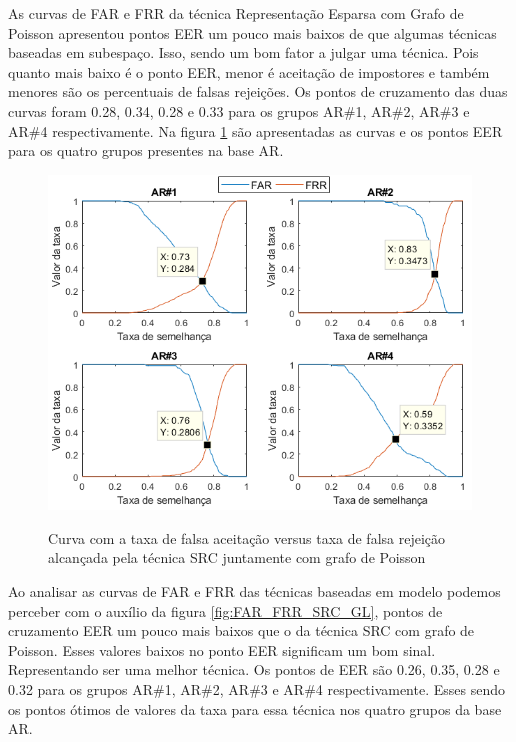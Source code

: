 As curvas de FAR e FRR da técnica Representação Esparsa com Grafo de Poisson apresentou pontos EER um pouco mais baixos de que algumas técnicas baseadas em subespaço. Isso, sendo um bom fator a julgar uma técnica. Pois quanto mais baixo é o ponto EER, menor é aceitação de impostores e também menores são os percentuais de falsas rejeições. Os pontos de cruzamento das duas curvas foram 0.28, 0.34, 0.28 e 0.33 para os grupos AR\#1, AR\#2, AR\#3 e AR\#4 respectivamente. Na figura \ref{fig:FAR_FRR_SRC_GP} são apresentadas as curvas e os pontos EER para os quatro grupos presentes na base AR.

\begin{figure}[H]
\centering
\caption{Curva com a taxa de falsa aceitação versus taxa de falsa rejeição alcançada pela técnica SRC juntamente com grafo de Poisson}
\includegraphics[scale=0.60]{imgs4/graficos_FAR_FRR/SRC_Poisson}
\label{fig:FAR_FRR_SRC_GP}
\end{figure}

Ao analisar as curvas de FAR e FRR das técnicas baseadas em modelo podemos perceber com o auxílio da figura \ref{fig:FAR_FRR_SRC_GL}, pontos de cruzamento EER um pouco mais baixos que o da técnica SRC com grafo de Poisson. Esses valores baixos no ponto EER significam um bom sinal. Representando   ser uma melhor técnica. Os pontos de EER são 0.26, 0.35, 0.28 e 0.32 para os grupos AR\#1, AR\#2, AR\#3 e AR\#4 respectivamente. Esses sendo os pontos ótimos de valores da taxa para essa técnica nos quatro grupos da base AR.

